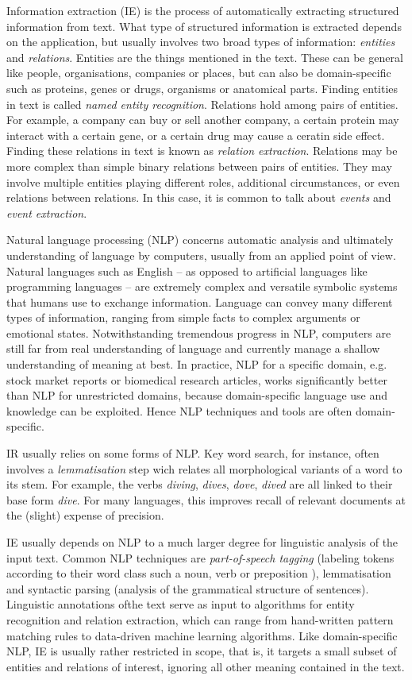 \documentclass[11pt,twoside,a4paper]{report}
\begin{document}
Information extraction (IE) is the process of automatically extracting structured information from text.
What type of structured information is extracted depends on the application, but usually involves two broad types of information: \emph{entities} and \emph{relations}.
Entities are the things mentioned in the text.
These can be general like people, organisations, companies or places, but can also be domain-specific such as proteins, genes or drugs, organisms or anatomical parts.
Finding entities in text is called \emph{named entity recognition}.
Relations hold among pairs of entities.
For example, a company can buy or sell another company, a certain protein may interact with a certain gene, or a certain drug may cause a ceratin side effect.
Finding these relations in text is known as \emph{relation extraction}.  
Relations may be more complex than simple binary relations between pairs of entities.
They may involve multiple entities playing different roles, additional circumstances, or even relations between relations.
In this case, it is common to talk about \emph{events} and \emph{event extraction}.    

Natural language processing (NLP) concerns automatic analysis and ultimately understanding of language by computers, usually from an applied point of view.  
Natural languages such as English -- as opposed to artificial languages like programming languages -- are extremely complex and versatile symbolic systems that humans use to exchange information.
Language can convey many different types of information, ranging from simple facts to complex arguments or emotional states.
Notwithstanding tremendous progress in NLP, computers are still far from real understanding of language and currently manage a shallow understanding of meaning at best.
In practice, NLP for a specific domain, e.g. stock market reports or biomedical research articles, works significantly better than NLP for unrestricted domains, because domain-specific language use and knowledge can be exploited.
Hence NLP techniques and tools are often domain-specific.

IR usually relies on some forms of NLP.
Key word search, for instance, often involves a \emph{lemmatisation} step wich relates all morphological variants of a word to its stem.
For example, the verbs \emph{diving}, \emph{dives}, \emph{dove}, \emph{dived} are all linked to their base form \emph{dive}.
For many languages, this improves recall of relevant documents at the (slight) expense of precision.

IE usually depends on NLP to a much larger degree for linguistic analysis of the input text.
Common NLP techniques are \emph{part-of-speech tagging} (labeling tokens according to their word class such a noun, verb or preposition ), lemmatisation and syntactic parsing (analysis of the grammatical structure of sentences).
Linguistic annotations ofthe  text serve as input to algorithms for entity recognition and relation extraction, which can range from hand-written pattern matching rules to data-driven machine learning algorithms.
Like domain-specific NLP, IE is usually rather restricted in scope, that is, it targets a small subset of entities and relations of interest, ignoring all other meaning contained in the text.    
\end{document}
